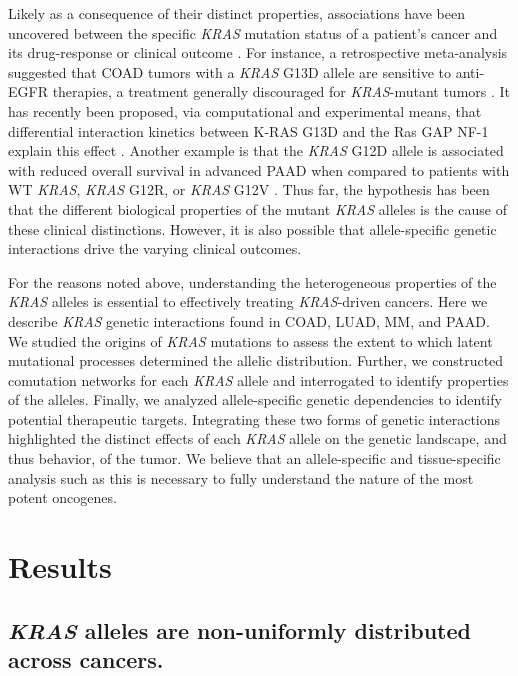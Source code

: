 \documentclass[english, 10pt, letterpaper]{article}
\newcommand{\KRAS}{\emph{KRAS}}
\newcommand{\kras}{K-RAS}
\begin{document}
Likely as a consequence of their distinct properties, associations have been uncovered between the specific \KRAS{} mutation status of a patient's cancer and its drug-response or clinical outcome \cite{Haigis2017, Li2018}.
For instance, a retrospective meta-analysis suggested that COAD tumors with a \KRAS{} G13D allele are sensitive to anti-EGFR therapies, a treatment generally discouraged for \KRAS{}-mutant tumors \cite{DeRoock2010}. 
It has recently been proposed, via computational and experimental means, that differential interaction kinetics between \kras{} G13D and the Ras GAP NF-1 explain this effect \cite{McFall2019, Rabara2019, Zafra2019}.
Another example is that the \KRAS{} G12D allele is associated with reduced overall survival in advanced PAAD when compared to patients with WT \KRAS{}, \KRAS{} G12R, or \KRAS{} G12V \cite{Bournet2016}.
Thus far, the hypothesis has been that the different biological properties of the mutant \KRAS{} alleles is the cause of these clinical distinctions.
However, it is also possible that allele-specific genetic interactions drive the varying clinical outcomes.

For the reasons noted above, understanding the heterogeneous properties of the \KRAS{} alleles is essential to effectively treating \KRAS{}-driven cancers.
Here we describe \KRAS{} genetic interactions found in COAD, LUAD, MM, and PAAD.
We studied the origins of \KRAS{} mutations to assess the extent to which latent mutational processes determined the allelic distribution.
Further, we constructed comutation networks for each \KRAS{} allele and interrogated to identify properties of the alleles.
Finally, we analyzed allele-specific genetic dependencies to identify potential therapeutic targets.
Integrating these two forms of genetic interactions highlighted the distinct effects of each \KRAS{} allele on the genetic landscape, and thus behavior, of the tumor.
We believe that an allele-specific and tissue-specific analysis such as this is necessary to fully understand the nature of the most potent oncogenes.



\section*{Results}

\subsection*{\KRAS{} alleles are non-uniformly distributed across cancers.}
\end{document}
